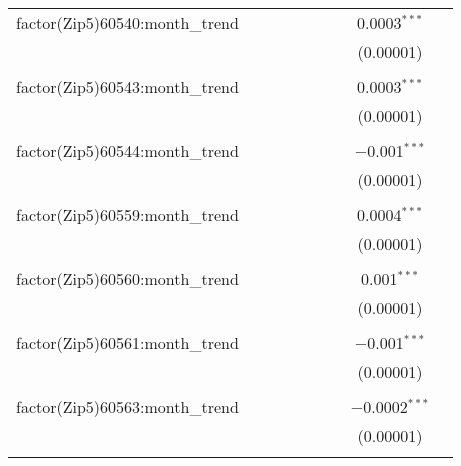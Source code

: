 \begin{table}[H]
{\begin{tabular}{@{\extracolsep{5pt}}lcccccccc}
  factor(Zip5)60540:month\_trend &  &  &  &  &  &  & 0.0003$^{***}$ &  \\  

   &  &  &  &  &  &  & (0.00001) &  \\  

   & & & & & & & & \\  

  factor(Zip5)60543:month\_trend &  &  &  &  &  &  & 0.0003$^{***}$ &  \\  

   &  &  &  &  &  &  & (0.00001) &  \\  

   & & & & & & & & \\  

  factor(Zip5)60544:month\_trend &  &  &  &  &  &  & $-$0.001$^{***}$ &  \\  

   &  &  &  &  &  &  & (0.00001) &  \\  

   & & & & & & & & \\  

  factor(Zip5)60559:month\_trend &  &  &  &  &  &  & 0.0004$^{***}$ &  \\  

   &  &  &  &  &  &  & (0.00001) &  \\  

   & & & & & & & & \\  

  factor(Zip5)60560:month\_trend &  &  &  &  &  &  & 0.001$^{***}$ &  \\  

   &  &  &  &  &  &  & (0.00001) &  \\  

   & & & & & & & & \\  

  factor(Zip5)60561:month\_trend &  &  &  &  &  &  & $-$0.001$^{***}$ &  \\  

   &  &  &  &  &  &  & (0.00001) &  \\  

   & & & & & & & & \\  

  factor(Zip5)60563:month\_trend &  &  &  &  &  &  & $-$0.0002$^{***}$ &  \\  

   &  &  &  &  &  &  & (0.00001) &  \\  

   & & & & & & & & \\  


\end{tabular}}
\end{table}
